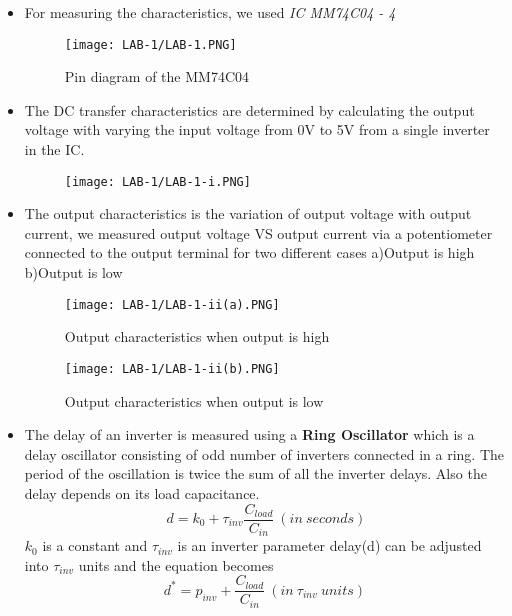 \documentclass[12pt]{article}
\begin{document}
  \begin{itemize}
      \item For measuring the characteristics, we used  \textit{IC MM74C04 - 4}
       \begin{figure}[H]
           \centering
           \texttt{[image: LAB-1/LAB-1.PNG]}
           \caption{Pin diagram of the MM74C04}
       \end{figure}
      \item The DC transfer characteristics are determined by calculating the output voltage with varying the input voltage from 0V to 5V from a single inverter in the IC.  
       \begin{figure}[H]
          \centering
          \texttt{[image: LAB-1/LAB-1-i.PNG]}
         \end{figure}
      \item The output characteristics is the variation of output voltage with output current, we measured output voltage VS output current via a potentiometer connected to the output terminal for two different cases a)Output is high b)Output is low 
        \begin{figure}[H]
          \centering
          \texttt{[image: LAB-1/LAB-1-ii(a).PNG]}
          \caption{Output characteristics when output is high}
        \end{figure}
        \begin{figure}[H]
          \centering
          \texttt{[image: LAB-1/LAB-1-ii(b).PNG]}
          \caption{Output characteristics when output is low}
        \end{figure}
      \item The delay of an inverter is measured using a \textbf{Ring Oscillator} which is a delay oscillator consisting of odd number of inverters  connected in a ring. The period of the oscillation is twice the sum of all the inverter delays. Also the delay depends on its load capacitance.
      \begin{equation}
          \ d = k_{0} + \tau_{inv}\frac{C_{load}}{C_{in}} \ (in \ seconds)
      \end{equation}
      $k_{0}$ is a constant and $\tau_{inv}$ is an inverter parameter
      delay(d) can be adjusted into $\tau_{inv}$ units and the equation becomes
            \begin{equation}
          d^* = p_{inv} + \frac{C_{load}}{C_{in}} \ (in \ \tau_{inv} \ units)
      \end{equation}

\end{itemize}
\end{document}
